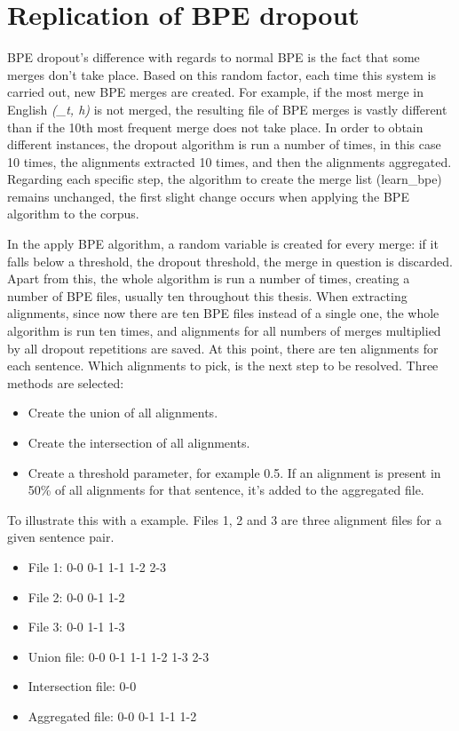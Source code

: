 \clearpage
\section{Replication of BPE dropout}\label{sec:replbpedrop}

BPE dropout's difference with regards to normal BPE is the fact that some merges don't take place. Based on this random factor, each time this system is carried out, new BPE merges are created. For example, if the most merge in English \emph{(\_t, h)} is not merged, the resulting file of BPE merges is vastly different than if the 10th most frequent merge does not take place. In order to obtain different instances, the dropout algorithm is run a number of times, in this case 10 times, the alignments extracted 10 times, and then the alignments aggregated. Regarding each specific step, the algorithm to create the merge list (learn\_bpe) remains unchanged, the first slight change occurs when applying the BPE algorithm to the corpus.

In the apply BPE algorithm, a random variable is created for every merge: if it falls below a threshold, the dropout threshold, the merge in question is discarded. Apart from this, the whole algorithm is run a number of times, creating a number of BPE files, usually ten throughout this thesis. When extracting alignments, since now there are ten BPE files instead of a single one, the whole algorithm is run ten times, and alignments for all numbers of merges multiplied by all dropout repetitions are saved. At this point, there are ten alignments for each sentence. Which alignments to pick, is the next step to be resolved. Three methods are selected:

\begin{itemize}
	\item Create the union of all alignments.
	\item Create the intersection of all alignments.
	\item Create a threshold parameter, for example 0.5. If an alignment is present in 50\% of all alignments for that sentence, it's added to the aggregated file.
\end{itemize}

To illustrate this with a example. Files 1, 2 and 3 are three alignment files for a given sentence pair.

\begin{itemize}
	\item File 1: 0-0 0-1 1-1 1-2 2-3
	\item File 2: 0-0 0-1 1-2
	\item File 3: 0-0 1-1 1-3
	\item Union file: 0-0 0-1 1-1 1-2 1-3 2-3
	\item Intersection file: 0-0
	\item Aggregated file: 0-0 0-1 1-1 1-2
\end{itemize}

